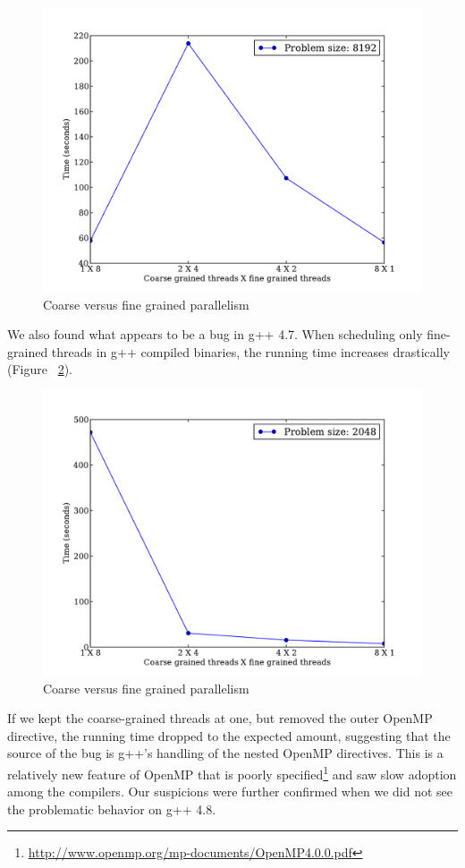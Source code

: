 \documentclass[11pt,onecolumn]{article}
\begin{document}
\begin{figure}[h!]
\centering
\includegraphics[width=.75\linewidth]{figures/coarse_versus_fine-grained_parallelism_(intel)}
\caption{Coarse versus fine grained parallelism}
\label{fig:combo}
\end{figure}

We also found what appears to be a bug in g++ 4.7. When scheduling only fine-grained threads in g++ compiled binaries, the running time increases drastically (Figure ~\ref{fig:combo_gcc}).

\begin{figure}[h!]
\centering
\includegraphics[width=.75\linewidth]{figures/coarse_versus_fine-grained_parallelism_(gcc)}
\caption{Coarse versus fine grained parallelism}
\label{fig:combo_gcc}
\end{figure}

If we kept the coarse-grained threads at one, but removed the outer OpenMP directive, the running time dropped to the expected amount, suggesting that the source of the bug is g++'s handling of the nested OpenMP directives. This is a relatively new feature of OpenMP that is poorly specified\footnote{\url{http://www.openmp.org/mp-documents/OpenMP4.0.0.pdf}} and saw slow adoption among the compilers. Our suspicions were further confirmed when we did not see the problematic behavior on g++ 4.8.
\end{document}
